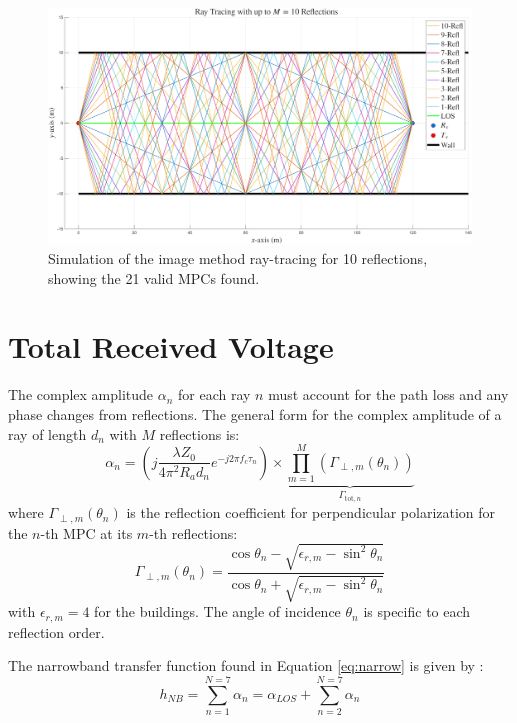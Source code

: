 \begin{figure}
	\centering
	\includegraphics[width=\linewidth]{content/4-images/ray-tracing-10-reflections.png}
	\caption{Simulation of the image method ray-tracing for 10 reflections, showing the 21 valid MPCs found.}
	\label{fig:raytracing-3reflex}
\end{figure}



\section{Total Received Voltage}
The complex amplitude $\alpha_n$ for each ray $n$ must account for the path loss and any phase changes from reflections. The general form for the complex amplitude of a ray of length $d_n$ with $M$ reflections is:
\begin{equation}
	\alpha_n = \left( j \frac{\lambda Z_0}{4\pi^2 R_a d_n} e^{-j2\pi f_c \tau_n} \right) \times \underbrace{\prod_{m=1}^{M}(\Gamma_{\perp, m}(\theta_{n}))}_{\Gamma_{\text{tot}, n}}
\end{equation}
where $\Gamma_{\perp, m}(\theta_n)$ is the reflection coefficient for perpendicular polarization for the $n$-th MPC at its  $m$-th reflections:
\begin{equation}
	\Gamma_{\perp, m}(\theta_n) = \frac{\cos\theta_n - \sqrt{\epsilon_{r, m} - \sin^2\theta_n}}{\cos\theta_n + \sqrt{\epsilon_{r, m} - \sin^2\theta_n}}
\end{equation}
with $\epsilon_{r,m} = 4$ for the buildings. The angle of incidence $\theta_n$ is specific to each reflection order.

The narrowband transfer function found in Equation \eqref{eq:narrow} is given by :
\begin{equation}
	h_{NB} = \sum_{n=1}^{N=7} \alpha_n = \alpha_{LOS} + \sum_{n=2}^{N=7} \alpha_n
\end{equation}

